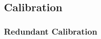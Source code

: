 \documentclass[twocolumn,numberedappendix]{emulateapj}
\begin{document}
\subsection{Calibration}
\subsubsection{Redundant Calibration}
%         
%
\end{document}
